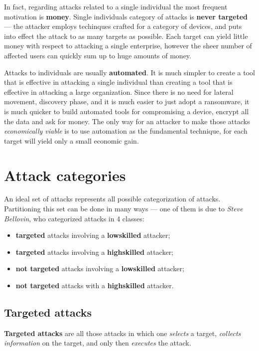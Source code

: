 \documentclass[10pt]{\classname}
\begin{document}
In fact, regarding attacks related to a single individual the most frequent
motivation is \textbf{money}. Single individuals category of attacks is
\textbf{never targeted} --- the attacker employs techinques crafted for a category
of devices, and puts into effect the attack to as many targets as possible.
Each target can yield little money with respect to attacking a single
enterprise, however the sheer number of affected users can quickly sum up to
huge amounts of money.

Attacks to individuals are usually \textbf{automated}. It is much
simpler to create a tool that is effective in attacking a single individual
than creating a tool that is effective in attacking a large organization. Since
there is no need for lateral movement, discovery phase, and it is much easier
to just adopt a ransomware, it is much quicker to build automated tools for
compromising a device, encrypt all the data and ask for money. The only way for
an attacker to make those attacks \emph{economically viable} is to use
automation as the fundamental technique, for each target will yield only a small
economic gain.

\section{Attack categories}

An ideal set of attacks represents all possible categorization of attacks.
Partitioning this set can be done in many ways --- one of them is due to
\emph{Steve Bellovin}, who categorized attacks in 4 classes:
\begin{itemize}
    \item \textbf{targeted} attacks involving a \textbf{low\textendash{}skilled} attacker;
    \item \textbf{targeted} attacks involving a \textbf{high\textendash{}skilled} attacker;
    \item \textbf{not targeted} attacks involving a \textbf{low\textendash{}skilled} attacker;
    \item \textbf{not targeted} attacks with a \textbf{high\textendash{}skilled} attacker.
\end{itemize}

\subsection{Targeted attacks}

\textbf{Targeted attacks} are all those attacks in which one \emph{selects} a
target, \emph{collects information} on the target, and only then
\emph{executes} the attack.
\end{document}
